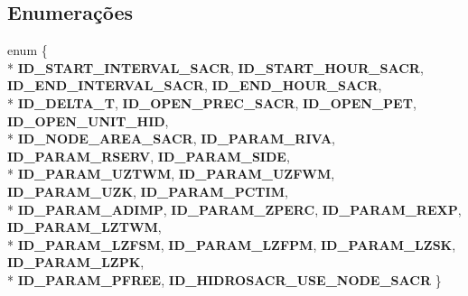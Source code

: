\subsection*{Enumerações}
\begin{DoxyCompactItemize}
\item 
enum \{ \\*
{\bf I\+D\+\_\+\+S\+T\+A\+R\+T\+\_\+\+I\+N\+T\+E\+R\+V\+A\+L\+\_\+\+S\+A\+CR}, 
{\bf I\+D\+\_\+\+S\+T\+A\+R\+T\+\_\+\+H\+O\+U\+R\+\_\+\+S\+A\+CR}, 
{\bf I\+D\+\_\+\+E\+N\+D\+\_\+\+I\+N\+T\+E\+R\+V\+A\+L\+\_\+\+S\+A\+CR}, 
{\bf I\+D\+\_\+\+E\+N\+D\+\_\+\+H\+O\+U\+R\+\_\+\+S\+A\+CR}, 
\\*
{\bf I\+D\+\_\+\+D\+E\+L\+T\+A\+\_\+T}, 
{\bf I\+D\+\_\+\+O\+P\+E\+N\+\_\+\+P\+R\+E\+C\+\_\+\+S\+A\+CR}, 
{\bf I\+D\+\_\+\+O\+P\+E\+N\+\_\+\+P\+ET}, 
{\bf I\+D\+\_\+\+O\+P\+E\+N\+\_\+\+U\+N\+I\+T\+\_\+\+H\+ID}, 
\\*
{\bf I\+D\+\_\+\+N\+O\+D\+E\+\_\+\+A\+R\+E\+A\+\_\+\+S\+A\+CR}, 
{\bf I\+D\+\_\+\+P\+A\+R\+A\+M\+\_\+\+R\+I\+VA}, 
{\bf I\+D\+\_\+\+P\+A\+R\+A\+M\+\_\+\+R\+S\+E\+RV}, 
{\bf I\+D\+\_\+\+P\+A\+R\+A\+M\+\_\+\+S\+I\+DE}, 
\\*
{\bf I\+D\+\_\+\+P\+A\+R\+A\+M\+\_\+\+U\+Z\+T\+WM}, 
{\bf I\+D\+\_\+\+P\+A\+R\+A\+M\+\_\+\+U\+Z\+F\+WM}, 
{\bf I\+D\+\_\+\+P\+A\+R\+A\+M\+\_\+\+U\+ZK}, 
{\bf I\+D\+\_\+\+P\+A\+R\+A\+M\+\_\+\+P\+C\+T\+IM}, 
\\*
{\bf I\+D\+\_\+\+P\+A\+R\+A\+M\+\_\+\+A\+D\+I\+MP}, 
{\bf I\+D\+\_\+\+P\+A\+R\+A\+M\+\_\+\+Z\+P\+E\+RC}, 
{\bf I\+D\+\_\+\+P\+A\+R\+A\+M\+\_\+\+R\+E\+XP}, 
{\bf I\+D\+\_\+\+P\+A\+R\+A\+M\+\_\+\+L\+Z\+T\+WM}, 
\\*
{\bf I\+D\+\_\+\+P\+A\+R\+A\+M\+\_\+\+L\+Z\+F\+SM}, 
{\bf I\+D\+\_\+\+P\+A\+R\+A\+M\+\_\+\+L\+Z\+F\+PM}, 
{\bf I\+D\+\_\+\+P\+A\+R\+A\+M\+\_\+\+L\+Z\+SK}, 
{\bf I\+D\+\_\+\+P\+A\+R\+A\+M\+\_\+\+L\+Z\+PK}, 
\\*
{\bf I\+D\+\_\+\+P\+A\+R\+A\+M\+\_\+\+P\+F\+R\+EE}, 
{\bf I\+D\+\_\+\+H\+I\+D\+R\+O\+S\+A\+C\+R\+\_\+\+U\+S\+E\+\_\+\+N\+O\+D\+E\+\_\+\+S\+A\+CR}
 \}
\end{DoxyCompactItemize}
